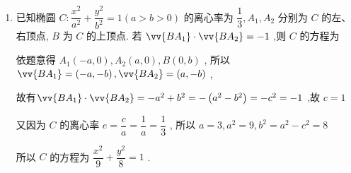 \begin{enumerate}
\begin{enumerate}
\begin{jieda}
\begin{dingautolist}{172}
            \end{dingautolist}
        \end{jieda}
    \item 已知椭圆 $C : \dfrac{{x}^{2}}{{a}^{2}} + \dfrac{{y}^{2}}{{b}^{2}} = 1\left( {a > b > 0}\right)$ 的离心率为 $\dfrac{1}{3},{A}_{1},{A}_{2}$ 分别为 $C$ 的左、右顶点, $B$ 为 $C$ 的上顶点. 若 $\vv{B{A}_{1}} \cdot  \vv{B{A}_{2}} =  - 1$ ,则 $C$ 的方程为
    \begin{jieda}
        依题意得 ${A}_{1}\left( {-a,0}\right) ,{A}_{2}\left( {a,0}\right) ,B\left( {0,b}\right)$ , 所以 $\vv{B{A}_{1}} = \left( {-a, - b}\right) ,\vv{B{A}_{2}} = \left( {a, - b}\right)$ ,
        
        故有$\vv{B{A}_{1}} \cdot  \vv{B{A}_{2}} =  - {a}^{2} + {b}^{2} =  - \left( {{a}^{2} - {b}^{2}}\right)  =  - {c}^{2} =  - 1$ ,故 $c = 1$
        
        又因为 $C$ 的离心率 $e = \dfrac{c}{a} = \dfrac{1}{a} = \dfrac{1}{3}$ , 所以 $a = 3,{a}^{2} = 9,{b}^{2} = {a}^{2} - {c}^{2} = 8$
        
        所以 $C$ 的方程为 $\dfrac{{x}^{2}}{9} + \dfrac{{y}^{2}}{8} = 1$ .
    \end{jieda} 
    

\end{enumerate}
\end{enumerate}
